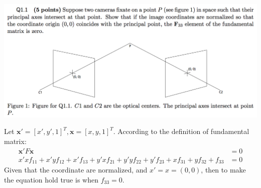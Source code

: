 \documentclass[12pt,letterpaper,boxed]{hmcpset}
\begin{document}

\begin{problem}[]
\includegraphics[width=\textwidth]{1_1.png}
\end{problem}

\begin{solution}
Let $\mathbf{x'} = [x', y', 1]^T, \mathbf{x} = [x, y, 1]^T$. According to the definition of fundamental matrix:
\begin{align*}
  \mathbf{x}'F\mathbf{x} &= 0\\
  x'xf_{11} + x'yf_{12} + x'f_{13} +
  y'xf_{21} + y'yf_{22} + y'f_{23} +
  xf_{31} + yf_{32} + f_{33}  &= 0
\end{align*}
Given that the coordinate are normalized, and $x' = x = (0,0)$, then to make the equation hold true is when $f_{33} = 0$.
\end{solution}
\end{document}
